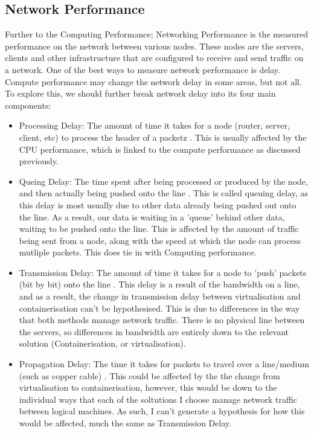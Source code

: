 \subsection{Network Performance}
Further to the Computing Performance; Networking Performance is the measured performance on the network between various nodes. These nodes are the servers, clients and other infrastructure that are configured to receive and send traffic on a network. One of the best ways to measure network performance is delay. Compute performance may change the network delay in some areas, but not all. To explore this, we should further break network delay into its four main components:
\begin{itemize}
  \item Processing Delay: The amount of time it takes for a node (router, server, client, etc) to process the header of a packetz \citep{ProcessingDelay}. This is usually affected by the CPU performance, which is linked to the compute performance as discussed previously.
  \item Queing Delay: The time spent after being processed or produced by the node, and then actually being pushed onto the line \citep{QueuingDelay}. This is called queuing delay, as this delay is most usually due to other data already being pushed out onto the line. As a result, our data is waiting in a 'queue' behind other data, waiting to be pushed onto the line. This is affected by the amount of traffic being sent from a node, along with the speed at which the node can process mutliple packets. This does tie in with Computing performance.
  \item Transmission Delay: The amount of time it takes for a node to 'push' packets (bit by bit) onto the line \citep[Chapter 7]{chen2005}. This delay is a result of the bandwidth on a line, and as a result, the change in transmission delay between virtualisation and containerisation can't be hypothesised. This is due to differences in the way that both methods manage network traffic. There is no physical line between the servers, so differences in bandwidth are entirely down to the relevant solution (Containerisation, or virtualisation).
  \item Propagation Delay: The time it takes for packets to travel over a line/medium (such as copper cable) \citep{PropogationDelay}. This could be affected by the the change from virtualisation to containerisation, however, this would be down to the individual ways that each of the soltutions I choose manage network traffic between logical machines. As such, I can't generate a hypothesis for how this would be affected, much the same as Transmission Delay.


\end{itemize}
